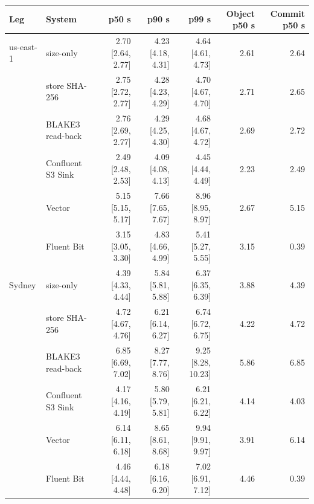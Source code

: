 
\begin{tabular}{@{}llrrrrr@{}}
\toprule
Leg & System & p50 s & p90 s & p99 s & Object p50 s & Commit p50 s \\
\midrule
us-east-1 & \sysname{} size-only & 2.70 [2.64, 2.77] & 4.23 [4.18, 4.31] & 4.64 [4.61, 4.73] & 2.61 & 2.64 \\
 & \sysname{} store SHA-256 & 2.75 [2.72, 2.77] & 4.28 [4.23, 4.29] & 4.70 [4.67, 4.70] & 2.71 & 2.65 \\
 & \sysname{} BLAKE3 read-back & 2.76 [2.69, 2.77] & 4.29 [4.25, 4.30] & 4.68 [4.67, 4.72] & 2.69 & 2.72 \\
 & Confluent S3 Sink & 2.49 [2.48, 2.53] & 4.09 [4.08, 4.13] & 4.45 [4.44, 4.49] & 2.23 & 2.49 \\
 & Vector & 5.15 [5.15, 5.17] & 7.66 [7.65, 7.67] & 8.96 [8.95, 8.97] & 2.67 & 5.15 \\
 & Fluent Bit & 3.15 [3.05, 3.30] & 4.83 [4.66, 4.99] & 5.41 [5.27, 5.55] & 3.15 & 0.39 \\
\addlinespace[1pt]
Sydney & \sysname{} size-only & 4.39 [4.33, 4.44] & 5.84 [5.81, 5.88] & 6.37 [6.35, 6.39] & 3.88 & 4.39 \\
 & \sysname{} store SHA-256 & 4.72 [4.67, 4.76] & 6.21 [6.14, 6.27] & 6.74 [6.72, 6.75] & 4.22 & 4.72 \\
 & \sysname{} BLAKE3 read-back & 6.85 [6.69, 7.02] & 8.27 [7.77, 8.76] & 9.25 [8.28, 10.23] & 5.86 & 6.85 \\
 & Confluent S3 Sink & 4.17 [4.16, 4.19] & 5.80 [5.79, 5.81] & 6.21 [6.21, 6.22] & 4.14 & 4.03 \\
 & Vector & 6.14 [6.11, 6.18] & 8.65 [8.61, 8.68] & 9.94 [9.91, 9.97] & 3.91 & 6.14 \\
 & Fluent Bit & 4.46 [4.44, 4.48] & 6.18 [6.16, 6.20] & 7.02 [6.91, 7.12] & 4.46 & 0.39 \\
\bottomrule
\end{tabular}
